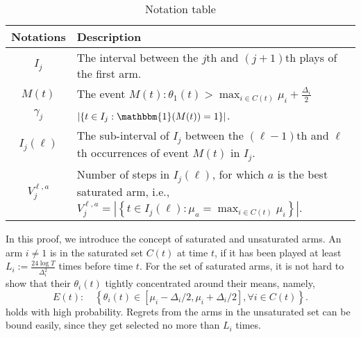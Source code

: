 \documentclass[letterpaper,11pt]{article}
\begin{document}
\begin{table}[h]
    \centering
    \renewcommand{\arraystretch}{1.2} %
    \begin{tabular}{c p{12cm}}
        \hline
        \textbf{Notations} & \textbf{Description} \\ 
        \hline
        $I_j$ & The interval between the $j$th and $(j+1)$th plays of the first arm. \\
        $M(t)$ & The event $M(t): \theta_1(t)>\max _{i \in C(t)} \mu_i+\frac{\Delta_i}{2}$
        \\ 
        $\gamma_j$ & $\left|\left\{t \in I_j: \mathbbm{1}(M(t)) = 1\right\}\right|$. \\
        $I_j(\ell)$ & The sub-interval of $I_j$ between the $(\ell-1)$th and $\ell$th occurrences of event $M(t)$ in $I_j$. \\
        $V_j^{\ell, a}$ & Number of steps in $I_j(\ell)$, for which $a$ is the best saturated arm, i.e., $V_j^{\ell, a}=\left|\left\{t \in I_j(\ell): \mu_a=\max _{i \in C(t)} \mu_i\right\}\right|$. \\
        
        \hline
    \end{tabular}
    \caption{Notation table}
    \label{tab:notation2}
\end{table}

In this proof, we introduce the concept of saturated and unsaturated arms. An arm $i \neq 1$ is in the saturated set $C(t)$ at time $t$, if it has been played at least $L_i := \frac{24 \log T}{\Delta_i^2}$ times before time $t$. 
For the set of saturated arms, it is not hard to show that their $\theta_i(t)$ tightly concentrated around their means, namely, 
$$
E(t): \quad\left\{\theta_i(t) \in\left[\mu_i-\Delta_i / 2, \mu_i+\Delta_i / 2\right], \forall i \in C(t)\right\} .
$$
holds with high probability. 
Regrets from the arms in the unsaturated set can be bound easily, since they get selected no more than $L_i$ times. 
\end{document}
